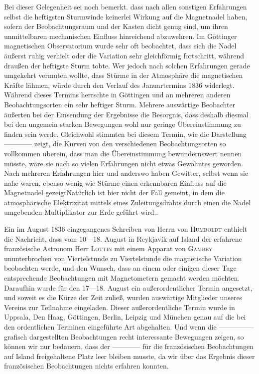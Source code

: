 Bei dieser Gelegenheit sei noch bemerkt. dass nach allen sonstigen Erfahrungen selbst die heftigsten Sturmwinde keinerlei Wirkung auf die Magnetnadel haben, sofern der Beobachtungsraum und der Kasten dicht genug sind, um ihren unmittelbaren mechanischen Einfluss hinreichend abzuwehren. Im Göttinger magnetischen Observatorium wurde sehr oft beobachtet, dass sich die Nadel äußerst ruhig verhielt oder die Variation sehr gleichförmig fortschritt, während draußen der heftigste Sturm tobte. Wer jedoch nach solchen Erfahrungen gerade umgekehrt vermuten wollte, dass Stürme in der Atmosphäre die magnetischen Kräfte lähmen, würde durch den Verlauf des Januartermins 1836 widerlegt. Während dieses Termins herrschte in Göttingen und an mehreren anderen Beobachtungsorten ein sehr heftiger Sturm. Mehrere auswärtige Beobachter äußerten bei der Einsendung der Ergebnisse die Besorgnis, dass deshalb diesmal bei den ungemein starken Bewegungen wohl nur geringe Übereinstimmung zu finden sein werde. Gleichwohl stimmten bei diesem Termin, wie die Darstellung ---\quad---\quad---\quad--- zeigt, die Kurven von den verschiedenen Beobachtungsorten so vollkommen überein, dass man die Übereinstimmung bewundernswert nennen müsste, wäre sie nach so vielen Erfahrungen nicht etwas Gewohntes geworden. Nach mehreren Erfahrungen hier und anderswo haben Gewitter, selbst wenn sie nahe waren, ebenso wenig wie Stürme einen erkennbaren Einfluss auf die Magnetnadel gezeigt\expandafter\def\csname HistoricalNoteText575\endcsname{Natürlich ist hier nicht der Fall gemeint, in dem die atmosphärische Elektrizität mittels eines Zuleitungsdrahts durch einen die Nadel umgebenden Multiplikator zur Erde geführt wird.}.

Ein im August 1836 eingegangenes Schreiben von Herrn von \textsc{Humboldt} enthielt die Nachricht, dass vom 10---18. August in Reykjavík auf Island der erfahrene französische Astronom Herr \textsc{Lottin} mit einem Apparat von \textsc{Gambey} ununterbrochen von Viertelstunde zu Viertelstunde die magnetische Variation beobachten werde, und den Wunsch, dass an einem oder einigen dieser Tage entsprechende Beobachtungen mit Magnetometern gemacht werden
möchten. Daraufhin wurde für den 17---18. August ein außerordentlicher Termin angesetzt, und soweit es die Kürze der Zeit zuließ, wurden auswärtige Mitglieder unseres Vereins zur Teilnahme eingeladen. Dieser außerordentliche Termin wurde in Uppsala, Den Haag, Göttingen, Berlin, Leipzig und München genau auf die bei den ordentlichen Terminen eingeführte Art abgehalten. Und wenn die ---\quad---\quad---\quad---\quad--- grafisch dargestellten Beobachtungen recht interessante Bewegungen zeigen, so können wir nur bedauern, dass der ---\quad---\quad---\quad--- für die französischen Beobachtungen auf Island freigehaltene Platz leer bleiben musste, da wir über das Ergebnis dieser französischen Beobachtungen nichts erfahren konnten.

